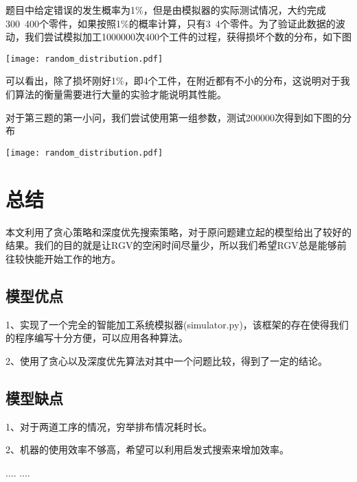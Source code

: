\documentclass{cumcmthesis}
\begin{document}
题目中给定错误的发生概率为1\%，但是由模拟器的实际测试情况，大约完成300~400个零件，如果按照1\%的概率计算，只有3~4个零件。为了验证此数据的波动，我们尝试模拟加工1000000次400个工件的过程，获得损坏个数的分布，如下图

\begin{center}
	\texttt{[image: random\_distribution.pdf]}
\end{center}

可以看出，除了损坏刚好1\%，即4个工件，在附近都有不小的分布，这说明对于我们算法的衡量需要进行大量的实验才能说明其性能。

对于第三题的第一小问，我们尝试使用第一组参数，测试200000次得到如下图的分布

\begin{center}
	\texttt{[image: random\_distribution.pdf]}
\end{center}

\section{总结}

本文利用了贪心策略和深度优先搜索策略，对于原问题建立起的模型给出了较好的结果。我们的目的就是让RGV的空闲时间尽量少，所以我们希望RGV总是能够前往较快能开始工作的地方。

\subsection{模型优点}

1、实现了一个完全的智能加工系统模拟器(simulator.py)，该框架的存在使得我们的程序编写十分方便，可以应用各种算法。

2、使用了贪心以及深度优先算法对其中一个问题比较，得到了一定的结论。

\subsection{模型缺点}

1、对于两道工序的情况，穷举排布情况耗时长。

2、机器的使用效率不够高，希望可以利用启发式搜索来增加效率。

\begin{thebibliography}{9}%
  ....
  ....
\end{thebibliography}
\end{document}

